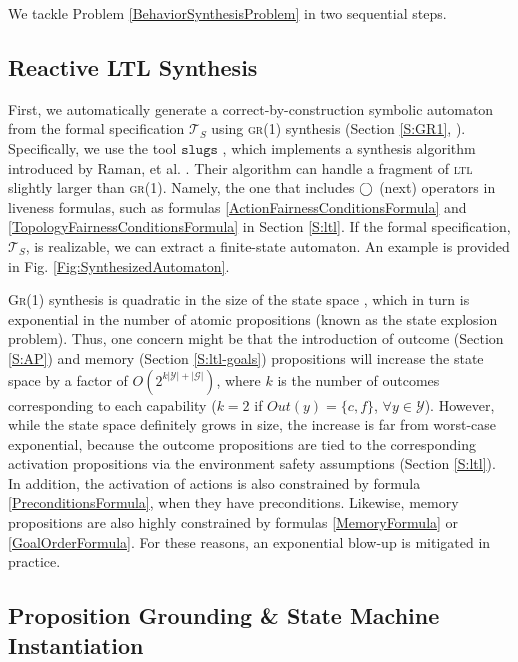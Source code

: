 
We tackle Problem \ref{BehaviorSynthesisProblem} in two sequential steps.

\subsection{Reactive LTL Synthesis}

First, we automatically generate a correct-by-construction symbolic automaton from the formal specification $\mathcal{T}_S$ using \textsc{gr(1)} synthesis (Section \ref{S:GR1}, \cite{Bloem2012GR1}).
Specifically, we use the tool $\mathtt{slugs}$ \cite{SLUGS}, which implements a synthesis algorithm introduced by Raman, et al. \cite{Vasu2013ICRA, Vasu2015TRO}.
Their algorithm can handle a fragment of \textsc{ltl} slightly larger than \textsc{gr(1)}.
Namely, the one that includes $\operatorname{\bigcirc}$ (next) operators in liveness formulas, such as formulas \eqref{ActionFairnessConditionsFormula} and \eqref{TopologyFairnessConditionsFormula} in Section \ref{S:ltl}.
If the formal specification, $\mathcal{T}_S$, is realizable, we can extract a finite-state automaton.
An example is provided in Fig. \ref{Fig:SynthesizedAutomaton}.

\textsc{Gr(1)} synthesis is quadratic in the size of the state space \cite{Bloem2012GR1}, which in turn is exponential in the number of atomic propositions (known as the state explosion problem).
Thus, one concern might be that the introduction of outcome (Section \ref{S:AP}) and memory (Section \ref{S:ltl-goals}) propositions will increase the state space by a factor of $O(2^{k | \mathcal{Y} | + | \mathcal{G} | })$, where $k$ is the number of outcomes corresponding to each capability ($k=2$ if $Out(y) = \{ c, f \}$, $\forall y \in \mathcal{Y}$).
However, while the state space definitely grows in size, the increase is far from worst-case exponential, because the outcome propositions are tied to the corresponding activation propositions via the environment safety assumptions (Section \ref{S:ltl}).
In addition, the activation of actions is also constrained by formula \eqref{PreconditionsFormula}, when they have preconditions.
Likewise, memory propositions are also highly constrained by formulas \eqref{MemoryFormula} or \eqref{GoalOrderFormula}.
For these reasons, an exponential blow-up is mitigated in practice.

\subsection{Proposition Grounding \& State Machine Instantiation}


